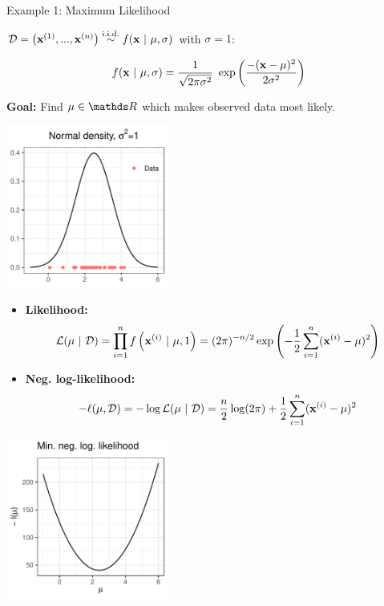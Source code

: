 \documentclass[11pt,compress,t,notes=noshow, xcolor=table]{beamer}
\begin{document}
\begin{vbframe}{Example 1: Maximum Likelihood}

$\D = \left(\xi[1], ..., \xi[n]\right) \overset{\text{i.i.d.}}{\sim} f(\xv ~|~ \mu, \sigma)$ with $\sigma = 1$: 

$$
	f(\xv ~|~ \mu, \sigma) = \frac{1}{\sqrt{2 \pi \sigma^{2}}}~\exp\left(\frac{-(\xv-\mu)^{2}}{2\sigma^{2}}\right)
$$

\textbf{Goal:} Find $\mu \in \R$ which makes observed data most likely. 

\begin{center}
	\begin{footnotesize}
	\includegraphics[width=0.4\textwidth, keepaspectratio]{figure_man/ml_normal_example_dnorm.pdf} 
	\end{footnotesize}
\end{center}

\framebreak 

\begin{itemize}
	\item \textbf{Likelihood:} \vspace*{-0.4cm}
 $$\mathcal{L}(\mu~|~\D)= \prod_{i=1}^{n} f\left(\xi~|~\mu, 1\right) = (2\pi)^{-n/2}\exp\left(-\frac{1}{2} \sum_{i=1}^{n} (\xi-\mu)^{2} \right)$$
	\item \textbf{Neg. log-likelihood:} \vspace*{-0.4cm}
$$- \ell(\mu, \D) = - \log \mathcal{L}(\mu~|~\D) = \frac{n}{2} \log(2\pi) + \frac{1}{2} \sum_{i=1}^{n} (\xi-\mu)^{2}$$
\end{itemize}

\vspace*{-0.3cm}

\begin{center}
	\begin{footnotesize}
	\includegraphics[width=0.4\textwidth, keepaspectratio]{figure_man/ml_normal_example_negloglike_nooptim.pdf} 
	\end{footnotesize}
\end{center}
\framebreak 


\end{vbframe}
\end{document}
